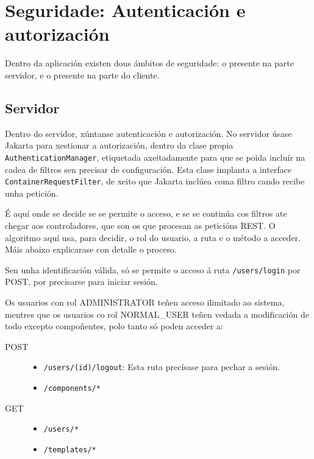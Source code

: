 \newcommand{\newthreadShift}[4][gray!30]{
  \newinst[#4]{#2}{#3}
  \stepcounter{threadnum}
  \node[below of=inst\theinstnum,node distance=0.8cm] (thread\thethreadnum) {};
  \tikzstyle{threadcolor\thethreadnum}=[fill=#1]
  \tikzstyle{instcolor#2}=[fill=#1]
}

\chapter{Seguridade: Autenticación e autorización}
\label{chap:seguridade}

Dentro da aplicación existen dous ámbitos de seguridade: o presente na parte servidor, e o presente na parte do cliente.

\section{Servidor}

Dentro do servidor, xúntanse autenticación e autorización. No servidor úsase Jakarta para xestionar a autorización, dentro da clase propia \texttt{AuthenticationManager}, etiquetada axeitadamente para que se poida incluír na cadea de filtros sen precisar de configuración. Esta clase implanta a interface \texttt{ContainerRequestFilter}, de xeito que Jakarta inclúea coma filtro cando recibe unha petición.\cite{jakartafilter}

É aquí onde se decide se se permite o acceso, e se se continúa cos filtros ate chegar aos controladores, que son os que procesan as peticións REST. O algoritmo aquí usa, para decidir, o rol do usuario, a ruta e o método a acceder. Máis abaixo explicarase con detalle o proceso.

Sen unha identificación válida, só se permite o acceso á ruta \texttt{/users/login} por POST, por precisarse para iniciar sesión.

Os usuarios con rol ADMINISTRATOR teñen acceso ilimitado ao sistema, mentres que os usuarios co rol NORMAL\_USER teñen vedada a modificación de todo excepto compoñentes, polo tanto só poden acceder a:

\begin{description}
    \item[POST]
        \begin{itemize}
            \item \texttt{/users/(id)/logout}: Esta ruta precísase para pechar a sesión.
            \item \texttt{/components/*}
        \end{itemize}
    \item[GET]
        \begin{itemize}
            \item \texttt{/users/*}
            \item \texttt{/templates/*}
        \end{itemize}
\end{description}

